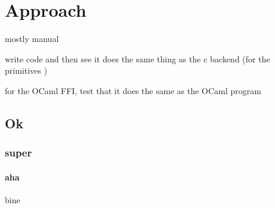 \section{Approach}

mostly manual

write code and then see it does the same thing as the c 
backend (for the primitives )

for the OCaml FFI, test that it does the same as the OCaml
program



\subsection{Ok}

\subsubsection{super}

\paragraph{aha} bine
